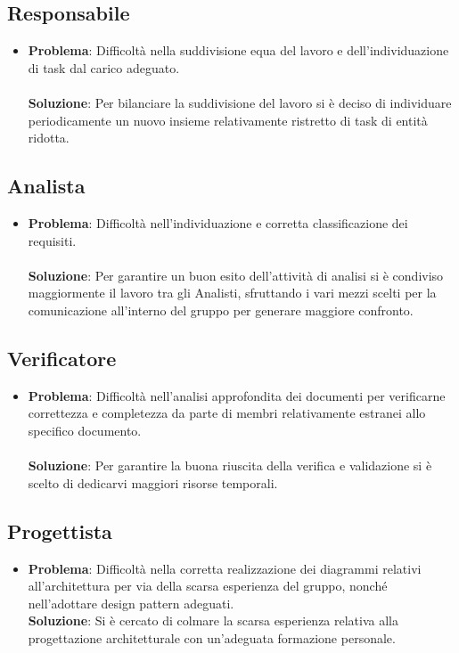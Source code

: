 \documentclass[openany,12pt,a4paper]{report}
\begin{document}
\subsection{Responsabile}

\begin{itemize}
	\item \textbf{Problema}: Difficoltà nella suddivisione equa del lavoro e dell'individuazione di task dal carico adeguato. \\ \\
	\textbf{Soluzione}: Per bilanciare la suddivisione del lavoro si è deciso di individuare periodicamente un nuovo insieme relativamente ristretto di task di entità ridotta.
\end{itemize}

\subsection{Analista}

\begin{itemize}
	\item \textbf{Problema}: Difficoltà nell'individuazione e corretta classificazione dei requisiti. \\ \\
	\textbf{Soluzione}: Per garantire un buon esito dell'attività di analisi si è condiviso maggiormente il lavoro tra gli Analisti, sfruttando i vari mezzi scelti per la comunicazione
	all'interno del gruppo per generare maggiore confronto.
\end{itemize}

\subsection{Verificatore}

\begin{itemize}
	\item \textbf{Problema}: Difficoltà nell'analisi approfondita dei documenti per verificarne correttezza e completezza da parte di membri relativamente estranei allo specifico documento. \\ \\
	\textbf{Soluzione}: Per garantire la buona riuscita della verifica e validazione si è scelto di dedicarvi maggiori risorse temporali.
\end{itemize}

\subsection{Progettista}
\begin{itemize}
	\item \textbf{Problema}: Difficoltà nella corretta realizzazione dei diagrammi relativi all'architettura per via della scarsa esperienza del gruppo, nonché nell'adottare design pattern adeguati. \\
	\textbf{Soluzione}: Si è cercato di colmare la scarsa esperienza relativa alla progettazione architetturale con un'adeguata formazione personale.
\end{itemize}
\end{document}
